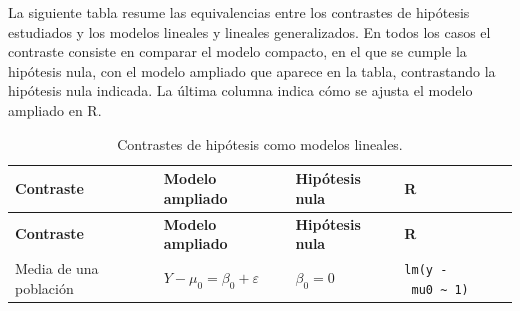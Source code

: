 \documentclass[
  spanish,
  a4paper,
]{scrreport}
\theoremstyle{plain}
\theoremstyle{definition}
\theoremstyle{definition}
\theoremstyle{remark}
\begin{document}
La siguiente tabla resume las equivalencias entre los contrastes de
hipótesis estudiados y los modelos lineales y lineales generalizados. En
todos los casos el contraste consiste en comparar el modelo compacto, en
el que se cumple la hipótesis nula, con el modelo ampliado que aparece
en la tabla, contrastando la hipótesis nula indicada. La última columna
indica cómo se ajusta el modelo ampliado en R.

\begin{longtable}[]{@{}
  >{\raggedright\arraybackslash}p{}
  >{\raggedright\arraybackslash}p{}
  >{\raggedright\arraybackslash}p{}
  >{\raggedright\arraybackslash}p{}@{}}
\caption{Contrastes de hipótesis como modelos
lineales.}\label{tbl-contrastes-modelos-lineales}\tabularnewline
\toprule\noalign{}
\begin{minipage}[b]{\linewidth}\raggedright
\textbf{Contraste}
\end{minipage} & \begin{minipage}[b]{\linewidth}\raggedright
\textbf{Modelo ampliado}
\end{minipage} & \begin{minipage}[b]{\linewidth}\raggedright
\textbf{Hipótesis nula}
\end{minipage} & \begin{minipage}[b]{\linewidth}\raggedright
\textbf{R}
\end{minipage} \\
\midrule\noalign{}
\endfirsthead
\toprule\noalign{}
\begin{minipage}[b]{\linewidth}\raggedright
\textbf{Contraste}
\end{minipage} & \begin{minipage}[b]{\linewidth}\raggedright
\textbf{Modelo ampliado}
\end{minipage} & \begin{minipage}[b]{\linewidth}\raggedright
\textbf{Hipótesis nula}
\end{minipage} & \begin{minipage}[b]{\linewidth}\raggedright
\textbf{R}
\end{minipage} \\
\midrule\noalign{}
\endhead
\bottomrule\noalign{}
\endlastfoot
Media de una población & \(Y-\mu_0=\beta_0+\varepsilon\) & \(\beta_0=0\)
& \texttt{lm(y\ -\ mu0\ \textasciitilde{}\ 1)} \\

\end{longtable}
\end{document}
